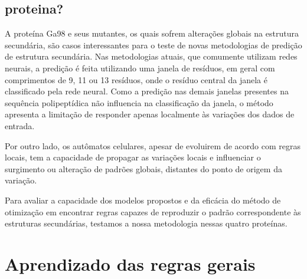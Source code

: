 \section{proteina?}






A proteína Ga98 e seus mutantes, os quais sofrem alterações globais na estrutura secundária, são casos interessantes para o teste de novas metodologias de predição de estrutura secundária. Nas metodologias atuais, que comumente utilizam redes neurais, a predição é feita utilizando uma janela de resíduos, em geral com comprimentos de 9, 11 ou 13 resíduos, onde o resíduo central da janela é classificado pela rede neural. Como a predição nas demais janelas presentes na sequência polipeptídica não influencia na classificação da janela, o método apresenta a limitação de responder apenas localmente às variações dos dados de entrada.  

Por outro lado, os autômatos celulares, apesar de evoluirem de acordo com regras locais, tem a capacidade de propagar as variações locais e influenciar o surgimento ou alteração de padrões globais, distantes do ponto de origem da variação. 

Para avaliar a capacidade dos modelos propostos e da eficácia do método de otimização em encontrar regras capazes de reproduzir o padrão correspondente às estruturas secundárias, testamos a nossa metodologia nessas quatro proteínas.



\chapter{Aprendizado das regras gerais}





